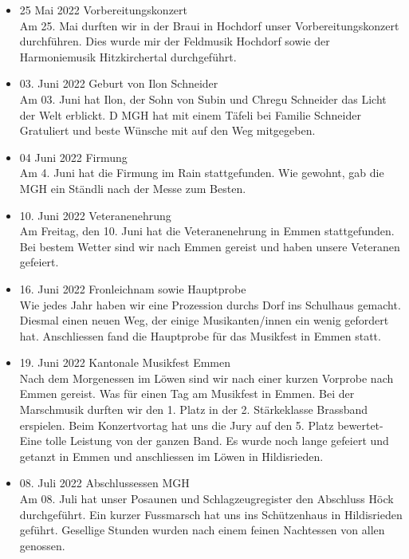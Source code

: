 \begin{history}
\begin{itemize}
        \item 25 Mai 2022 Vorbereitungskonzert\\
              Am 25. Mai durften wir in der Braui in Hochdorf unser Vorbereitungskonzert durchführen.
              Dies wurde mir der Feldmusik Hochdorf sowie der Harmoniemusik Hitzkirchertal
              durchgeführt.

        \item 03. Juni 2022 Geburt von Ilon Schneider\\
              Am 03. Juni hat Ilon, der Sohn von Subin und Chregu Schneider das Licht der Welt erblickt.
              D MGH hat mit einem Täfeli bei Familie Schneider Gratuliert und beste Wünsche mit auf den
              Weg mitgegeben.

        \item 04 Juni 2022 Firmung\\
              Am 4. Juni hat die Firmung im Rain stattgefunden. Wie gewohnt, gab die MGH ein Ständli
              nach der Messe zum Besten.

        \item 10. Juni 2022 Veteranenehrung\\
              Am Freitag, den 10. Juni hat die Veteranenehrung in Emmen stattgefunden.
              Bei bestem Wetter sind wir nach Emmen gereist und haben unsere Veteranen gefeiert.

        \item 16. Juni 2022 Fronleichnam sowie Hauptprobe\\
              Wie jedes Jahr haben wir eine Prozession durchs Dorf ins Schulhaus gemacht. Diesmal
              einen neuen Weg, der einige Musikanten/innen ein wenig gefordert hat. Anschliessen fand
              die Hauptprobe für das Musikfest in Emmen statt.

        \item 19. Juni 2022 Kantonale Musikfest Emmen\\
              Nach dem Morgenessen im Löwen sind wir nach einer kurzen Vorprobe nach Emmen
              gereist.
              Was für einen Tag am Musikfest in Emmen. Bei der Marschmusik durften wir den 1. Platz in
              der 2. Stärkeklasse Brassband erspielen.
              Beim Konzertvortag hat uns die Jury auf den 5. Platz bewertet- Eine tolle Leistung von der
              ganzen Band. Es wurde noch lange gefeiert und getanzt in Emmen und anschliessen im
              Löwen in Hildisrieden.

        \item 08. Juli 2022 Abschlussessen MGH\\
              Am 08. Juli hat unser Posaunen und Schlagzeugregister den Abschluss Höck durchgeführt.
              Ein kurzer Fussmarsch hat uns ins Schützenhaus in Hildisrieden geführt. Gesellige Stunden
              wurden nach einem feinen Nachtessen von allen genossen.


\end{itemize}
\end{history}
